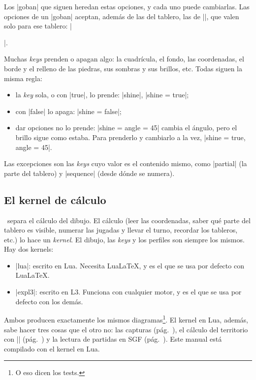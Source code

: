 Los |goban| que siguen heredan estas opciones, y cada uno puede cambiarlas. Las opciones de un |goban| aceptan, además de las del tablero, las de |\pgfgoset|, que valen solo para ese tablero: |\begin{goban}[9, stone = {radius = 4pt}, mark = {line = {color = red}}]|.

\label{subsec:prender}Muchas \emph{keys} prenden o apagan algo: la cuadrícula, el fondo, las coordenadas, el borde y el relleno de las piedras, sus sombras y sus brillos, etc. Todas siguen la misma regla:
\begin{itemize}
	\item la \emph{key} sola, o con |true|, lo prende: |shine|, |shine = true|;
	\item con |false| lo apaga: |shine = false|;
	\item dar opciones no lo prende: |shine = {angle = 45}| cambia el ángulo, pero el brillo sigue como estaba. Para prenderlo y cambiarlo a la vez, |shine = {true, angle = 45}|.
\end{itemize}
Las excepciones son las \emph{keys} cuyo valor es el contenido mismo, como |partial| (la parte del tablero) y |sequence| (desde dónde se numera).
\subsection{El kernel de cálculo}
\label{subsec:kernel}

\pgfgoname\ separa el cálculo del dibujo. El cálculo (leer las coordenadas, saber qué parte del tablero es visible, numerar las jugadas y llevar el turno, recordar los tableros, etc.) lo hace un \emph{kernel}. El dibujo, las \emph{keys} y los perfiles son siempre los mismos. Hay dos kernels:
\begin{itemize}
	\item |lua|: escrito en Lua. Necesita Lua\LaTeX, y es el que se usa por defecto con Lua\LaTeX.
	\item |expl3|: escrito en L3. Funciona con cualquier motor, y es el que se usa por defecto con los demás.
\end{itemize}

Ambos producen exactamente los mismos diagramas\footnote{O eso dicen los tests.}. El kernel en Lua, además, sabe hacer tres cosas que el otro no: las capturas (pág.~\pageref{subsec:capturas}), el cálculo del territorio con || (pág.~\pageref{subsec:territorio}) y la lectura de partidas en SGF (pág.~\pageref{subsec:sgf}). Este manual está compilado con el kernel en Lua.


\end{goban}
